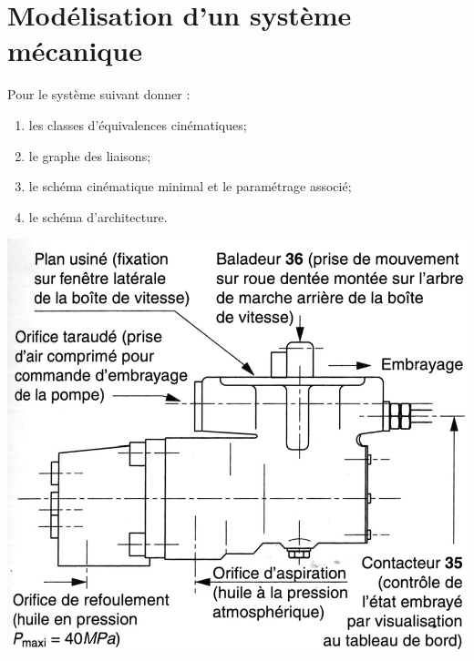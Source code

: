 \documentclass[11pt,oneside]{article}
\begin{document}
\section{Modélisation d'un système mécanique}
\begin{minipage}[c]{.55\linewidth}
Pour le système suivant donner :
\begin{enumerate}
\item les classes d'équivalences cinématiques;
\item le graphe des liaisons;
\item le schéma cinématique minimal et le paramétrage associé;
\item le schéma d'architecture.
\end{enumerate}
\end{minipage}\hfill
\begin{minipage}[c]{.4\linewidth}
\includegraphics[width=.95\textwidth]{png/fig1}
\end{minipage}\hfill

\vspace{.5cm}


\begin{center}
\end{center}
 
\end{document}
